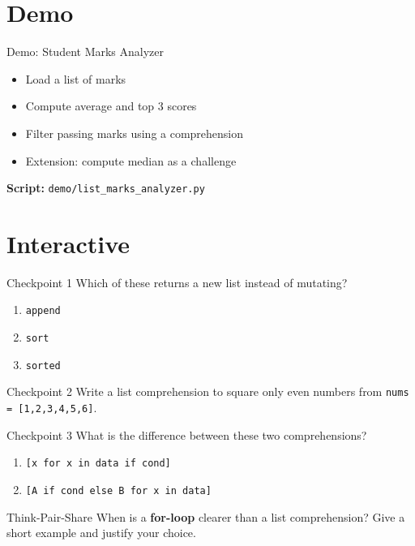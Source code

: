 \documentclass{beamer}
\begin{document}
\section{Demo}
\label{sec:demo}

\begin{frame}[fragile]{Demo: Student Marks Analyzer}
  \begin{itemize}[<+->]
    \item Load a list of marks
    \item Compute average and top 3 scores
    \item Filter passing marks using a comprehension
    \item Extension: compute median as a challenge
  \end{itemize}
  \vspace{0.4em}
  \textbf{Script:} \texttt{demo/list\_marks\_analyzer.py}
\end{frame}

\section{Interactive}
\label{sec:interactive}

\begin{frame}[fragile]{Checkpoint 1}
  Which of these returns a new list instead of mutating?
  \begin{enumerate}[<+->]
    \item \texttt{append}
    \item \texttt{sort}
    \item \texttt{sorted}
  \end{enumerate}
\end{frame}

\begin{frame}[fragile]{Checkpoint 2}
  Write a list comprehension to square only even numbers from
  \texttt{nums = [1,2,3,4,5,6]}.
\end{frame}

\begin{frame}[fragile]{Checkpoint 3}
  What is the difference between these two comprehensions?
  \begin{enumerate}[<+->]
    \item \texttt{[x for x in data if cond]}
    \item \texttt{[A if cond else B for x in data]}
  \end{enumerate}
\end{frame}

\begin{frame}[fragile]{Think-Pair-Share}
  When is a \textbf{for-loop} clearer than a list comprehension?
  Give a short example and justify your choice.
\end{frame}
\end{document}
